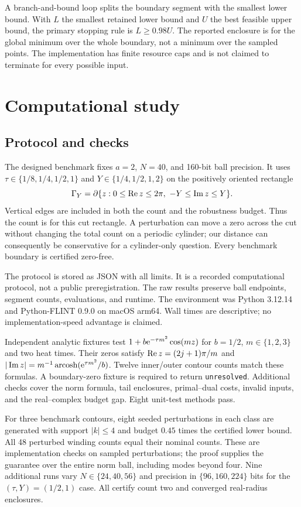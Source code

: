 \documentclass[11pt]{article}
\begin{document}
A branch-and-bound loop splits the boundary segment with the smallest lower bound. With $L$ the smallest retained lower bound and $U$ the best feasible upper bound, the primary stopping rule is $L\ge0.98U$. The reported enclosure is for the global minimum over the whole boundary, not a minimum over the sampled points. The implementation has finite resource caps and is not claimed to terminate for every possible input.

\section{Computational study}
\subsection{Protocol and checks}
The designed benchmark fixes $a=2$, $N=40$, and 160-bit ball precision. It uses $\tau\in\{1/8,1/4,1/2,1\}$ and $Y\in\{1/4,1/2,1,2\}$ on the positively oriented rectangle
\begin{equation}
 \Gamma_Y=\partial\{z:0\le\Rea z\le2\pi,\ -Y\le\Ima z\le Y\}.
\end{equation}
Vertical edges are included in both the count and the robustness budget. Thus the count is for this cut rectangle. A perturbation can move a zero across the cut without changing the total count on a periodic cylinder; our distance can consequently be conservative for a cylinder-only question. Every benchmark boundary is certified zero-free.

The protocol is stored as JSON with all limits. It is a recorded computational protocol, not a public preregistration. The raw results preserve ball endpoints, segment counts, evaluations, and runtime. The environment was Python 3.12.14 and Python-FLINT 0.9.0 on macOS arm64. Wall times are descriptive; no implementation-speed advantage is claimed.

Independent analytic fixtures test $1+b\mathrm e^{-\tau m^2}\cos(mz)$ for $b=1/2$, $m\in\{1,2,3\}$ and two heat times. Their zeros satisfy $\operatorname{Re} z=(2j+1)\pi/m$ and
$|\operatorname{Im} z|=m^{-1}\operatorname{arcosh}(\mathrm e^{\tau m^2}/b)$. Twelve inner/outer contour counts match these formulas. A boundary-zero fixture is required to return \texttt{unresolved}. Additional checks cover the norm formula, tail enclosures, primal--dual costs, invalid inputs, and the real--complex budget gap. Eight unit-test methods pass.

For three benchmark contours, eight seeded perturbations in each class are generated with support $|k|\le4$ and budget $0.45$ times the certified lower bound. All 48 perturbed winding counts equal their nominal counts. These are implementation checks on sampled perturbations; the proof supplies the guarantee over the entire norm ball, including modes beyond four. Nine additional runs vary $N\in\{24,40,56\}$ and precision in $\{96,160,224\}$ bits for the $(\tau,Y)=(1/2,1)$ case. All certify count two and converged real-radius enclosures.
\end{document}

